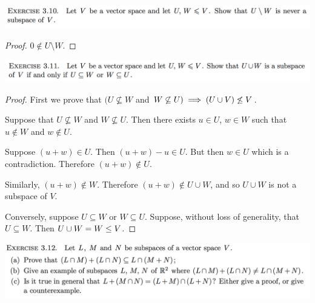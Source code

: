 \documentclass[12pt]{article}
\begin{document}
\begin{mdframed}
\includegraphics[width=400pt]{img/oxford-prelims-M1-linear-algebra-3-10.png}
\end{mdframed}

\begin{proof}
  $0 \notin U \setminus W$.
\end{proof}

\begin{mdframed}
\includegraphics[width=400pt]{img/oxford-prelims-M1-linear-algebra-3-11.png}
\end{mdframed}


\begin{proof}
  First we prove that $(U \not\subseteq W$ and
  $W \not\subseteq U) \implies (U \cup V) \not\leq V$.

  Suppose that $U \not\subseteq W$ and $W \not\subseteq U$. Then there exists
  $u \in U$, $w \in W$ such that $u \notin W$ and $w \notin U$.

  Suppose $(u + w) \in U$. Then $(u + w) - u \in U$. But then $w \in U$ which
  is a contradiction. Therefore $(u + w) \notin U$.

  Similarly, $(u + w) \notin W$. Therefore $(u + w) \notin U \cup W$, and so
  $U \cup W$ is not a subspace of $V$.

  Conversely, suppose $U \subseteq W$ or $W \subseteq U$. Suppose, without loss
  of generality, that $U \subseteq W$. Then $U \cup W = W \leq V$.

\end{proof}

\begin{mdframed}
\includegraphics[width=400pt]{img/oxford-prelims-M1-linear-algebra-3-12.png}
\end{mdframed}
\end{document}
